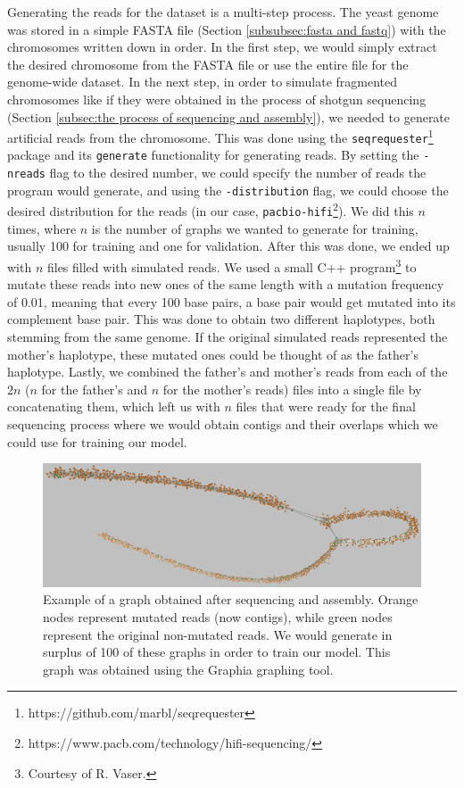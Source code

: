 \documentclass[times, utf8, diplomski, english]{fer_eng}
\begin{document}
Generating the reads for the dataset is a multi-step process. The yeast genome was stored in a simple FASTA file (Section \ref{subsubsec:fasta and fastq}) with the chromosomes written down in order. In the first step, we would simply extract the desired chromosome from the FASTA file or use the entire file for the genome-wide dataset. In the next step, in order to simulate fragmented chromosomes like if they were obtained in the process of shotgun sequencing (Section \ref{subsec:the process of sequencing and assembly}), we needed to generate artificial reads from the chromosome. This was done using the \texttt{seqrequester}\footnote{https://github.com/marbl/seqrequester} package and its \texttt{generate} functionality for generating reads. By setting the \texttt{-nreads} flag to the desired number, we could specify the number of reads the program would generate, and using the \texttt{-distribution} flag, we could choose the desired distribution for the reads (in our case, \texttt{pacbio-hifi}\footnote{https://www.pacb.com/technology/hifi-sequencing/}). We did this $n$ times, where $n$ is the number of graphs we wanted to generate for training, usually 100 for training and one for validation. After this was done, we ended up with $n$ files filled with simulated reads. We used a small C++ program\footnote{Courtesy of R. Vaser.} to mutate these reads into new ones of the same length with a mutation frequency of 0.01, meaning that every 100 base pairs, a base pair would get mutated into its complement base pair. This was done to obtain two different haplotypes, both stemming from the same genome. If the original simulated reads represented the mother's haplotype, these mutated ones could be thought of as the father's haplotype. Lastly, we combined the father's and mother's reads from each of the $2n$ ($n$ for the father's and $n$ for the mother's reads) files into a single file by concatenating them, which left us with $n$ files that were ready for the final sequencing process where we would obtain contigs and their overlaps which we could use for training our model.

\begin{figure}[h]
	\centering
	\includegraphics[width=\textwidth]{images/graph_example.png}
	\caption[Graph]{Example of a graph obtained after sequencing and assembly. Orange nodes represent mutated reads (now contigs), while green nodes represent the original non-mutated reads. We would generate in surplus of 100 of these graphs in order to train our model. This graph was obtained using the Graphia\footnotemark{} graphing tool.}
	\label{fig:graph}
\end{figure}
\end{document}
